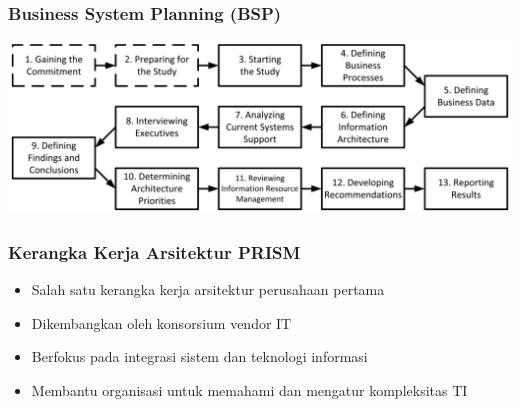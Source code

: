 \documentclass[aspectratio=169, table]{beamer}
\begin{document}
	{
		\begin{frame}
			\frametitle{Business System Planning (BSP)}
			\begin{center}
				\includegraphics[width=\textwidth]{../figures/bsp}
			\end{center}
		\end{frame}
	}
	
	\begin{frame}
		\frametitle{Kerangka Kerja Arsitektur PRISM}
		\begin{itemize}
			\item Salah satu kerangka kerja arsitektur perusahaan pertama
			\item Dikembangkan oleh konsorsium vendor IT
			\item Berfokus pada integrasi sistem dan teknologi informasi
			\item Membantu organisasi untuk memahami dan mengatur kompleksitas TI
		\end{itemize}
	\end{frame}
	
\end{document}

